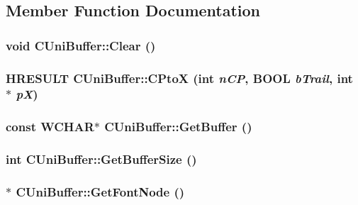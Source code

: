 \subsection{Member Function Documentation}
\hypertarget{class_c_uni_buffer_a6939a6f250ac4d32314e2124f17a037f}{
\subsubsection[{Clear}]{\setlength{\rightskip}{0pt plus 5cm}void CUniBuffer::Clear ()}}
\label{class_c_uni_buffer_a6939a6f250ac4d32314e2124f17a037f}
\hypertarget{class_c_uni_buffer_a9d8522f9cb2fcc14b0e9e43cd4b70f44}{
\subsubsection[{CPtoX}]{\setlength{\rightskip}{0pt plus 5cm}HRESULT CUniBuffer::CPtoX (int {\em nCP}, \/  BOOL {\em bTrail}, \/  int $\ast$ {\em pX})}}
\label{class_c_uni_buffer_a9d8522f9cb2fcc14b0e9e43cd4b70f44}
\hypertarget{class_c_uni_buffer_a0a2a93af329ebeedcea0cf67b166fd8f}{
\subsubsection[{GetBuffer}]{\setlength{\rightskip}{0pt plus 5cm}const WCHAR$\ast$ CUniBuffer::GetBuffer ()}}
\label{class_c_uni_buffer_a0a2a93af329ebeedcea0cf67b166fd8f}
\hypertarget{class_c_uni_buffer_acba24481f6d469d762e0c39f31eba80d}{
\subsubsection[{GetBufferSize}]{\setlength{\rightskip}{0pt plus 5cm}int CUniBuffer::GetBufferSize ()}}
\label{class_c_uni_buffer_acba24481f6d469d762e0c39f31eba80d}
\hypertarget{class_c_uni_buffer_a8c781a0b6673cb2e1c0fd67e9bdcebb5}{
\subsubsection[{GetFontNode}]{$\ast$ CUniBuffer::GetFontNode ()}}

